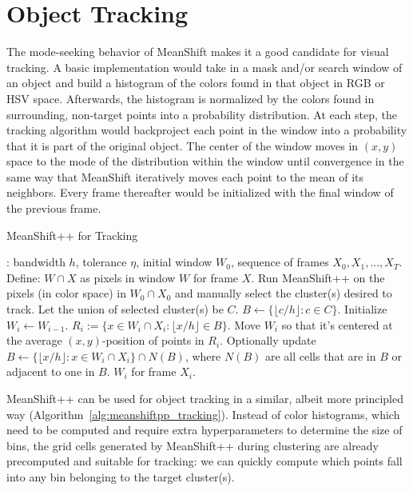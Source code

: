 \section{Object Tracking}

The mode-seeking behavior of MeanShift makes it a good candidate for visual tracking. A basic implementation would take in a mask and/or search window of an object and build a histogram of the colors found in that object in RGB or HSV space. Afterwards, the histogram is normalized by the colors found in surrounding, non-target points into a probability distribution. At each step, the tracking algorithm would backproject each point in the window into a probability that it is part of the original object. The center of the window moves in $(x, y)$ space to the mode of the distribution within the window until convergence in the same way that MeanShift iteratively moves each point to the mean of its neighbors. Every frame thereafter would be initialized with the final window of the previous frame.

\begin{algorithm}
\caption{MeanShift++ for Tracking}
\label{alg:meanshiftpp_tracking}
\begin{algorithmic}[H]
  : bandwidth $h$, tolerance $\eta$, initial window $W_0$, sequence of frames $X_0,X_1,...,X_T$.
  \State Define: $W \cap X$ as pixels in window $W$ for frame $X$.
  \State Run MeanShift++ on the pixels (in color space) in $W_0 \cap X_0$ and manually select the cluster(s) desired to track. Let the union of selected cluster(s) be $C$.
  \State $B \leftarrow \{\lfloor c / h \rfloor  : c \in C\}$.
    \State Initialize $W_i \leftarrow W_{i-1}$.
    \Do
    \State $R_i := \{ x \in W_i \cap X_i : \lfloor x / h \rfloor \in B \}$.
    \State Move $W_i$ so that it's centered at the average $(x,y)$-position of points in $R_i$.
    \State Optionally update $B \leftarrow \{\lfloor x / h \rfloor  : x \in W_i \cap X_i\} \cap N(B)$, where $N(B)$ are all cells that are in $B$ or adjacent to one in $B$.
     $W_i$ for frame $X_i$.
  \EndFor
\end{algorithmic}
\end{algorithm}

MeanShift++ can be used for object tracking in a similar, albeit more principled way (Algorithm~\ref{alg:meanshiftpp_tracking}). Instead of color histograms, which need to be computed and require extra hyperparameters to determine the size of bins, the grid cells generated by MeanShift++ during clustering are already precomputed and suitable for tracking: we can quickly compute which points fall into any bin belonging to the target cluster(s).

